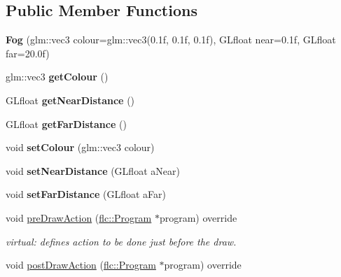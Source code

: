 \subsection*{Public Member Functions}
\begin{DoxyCompactItemize}
\item 
\mbox{\label{classflw_1_1flf_1_1Fog_a2bfdacc7a2c9b4320af0ad5dbe2989e8}} 
{\bfseries Fog} (glm\+::vec3 colour=glm\+::vec3(0.\+1f, 0.\+1f, 0.\+1f), G\+Lfloat near=0.\+1f, G\+Lfloat far=20.\+0f)
\item 
\mbox{\label{classflw_1_1flf_1_1Fog_ae70d98849f2f0d569eb79177cfb00c1c}} 
glm\+::vec3 {\bfseries get\+Colour} ()
\item 
\mbox{\label{classflw_1_1flf_1_1Fog_acdc4eec649e8e103e826b27d078b9b78}} 
G\+Lfloat {\bfseries get\+Near\+Distance} ()
\item 
\mbox{\label{classflw_1_1flf_1_1Fog_a47fa640d7ac15c6f00865fb65d9200c5}} 
G\+Lfloat {\bfseries get\+Far\+Distance} ()
\item 
\mbox{\label{classflw_1_1flf_1_1Fog_a878c0fe57d32ed19b953a2b80049df51}} 
void {\bfseries set\+Colour} (glm\+::vec3 colour)
\item 
\mbox{\label{classflw_1_1flf_1_1Fog_a92734a69fca7b000d3656642971624c4}} 
void {\bfseries set\+Near\+Distance} (G\+Lfloat a\+Near)
\item 
\mbox{\label{classflw_1_1flf_1_1Fog_abcd9c04cd7c8a793e63409ee7a8ba82a}} 
void {\bfseries set\+Far\+Distance} (G\+Lfloat a\+Far)
\item 
void \hyperlink{classflw_1_1flf_1_1Fog_a0d426e670e2b976601144e28c7dc5a48}{pre\+Draw\+Action} (\hyperlink{classflw_1_1flc_1_1Program}{flc\+::\+Program} $\ast$program) override
\begin{DoxyCompactList}\small\item\em virtual\+: defines action to be done just before the draw. \end{DoxyCompactList}\item 
void \hyperlink{classflw_1_1flf_1_1Fog_a23da383300538478081e23277bcca4fa}{post\+Draw\+Action} (\hyperlink{classflw_1_1flc_1_1Program}{flc\+::\+Program} $\ast$program) override

\end{DoxyCompactItemize}

